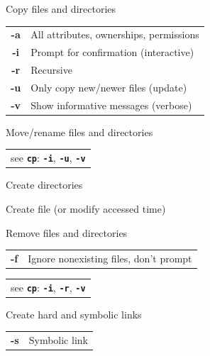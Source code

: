 \documentclass[12pt, a4paper]
{article}
\begin{document}
\begin{multicols}{3}
\begin{description}[nolistsep]
	\item[cp] Copy files and directories
	\item
	\begin{tabular}{cl}
		{\large \ttfamily \textbf{-a}} & All attributes, ownerships, permissions \\
		{\large \ttfamily \textbf{-i}} & Prompt for confirmation (interactive)\\
		{\large \ttfamily \textbf{-r}} & Recursive \\
		{\large \ttfamily \textbf{-u}} & Only copy new/newer files (update) \\
		{\large \ttfamily \textbf{-v}} & Show informative messages (verbose)\\
	\end{tabular}
	\item[mv] Move/rename files and directories
	\item
	\begin{tabular}{l}
		see \texttt{\textbf{cp}}: \texttt{\textbf{-i}}, \texttt{\textbf{-u}}, \texttt{\textbf{-v}}
	\end{tabular}
	\item[mkdir] Create directories
	\item[touch] Create file (or modify accessed time)
	\item[rm] Remove files and directories
	\item
	\begin{tabular}{cl}
		{\large \ttfamily \textbf{-f}} & Ignore nonexisting files, don't prompt
	\end{tabular}
	\item
	\begin{tabular}{l}
		see \texttt{\textbf{cp}}: \texttt{\textbf{-i}}, \texttt{\textbf{-r}}, \texttt{\textbf{-v}}
	\end{tabular}
	\item[ln] Create hard and symbolic links
	\item
	\begin{tabular}{cl}
		{\large \ttfamily \textbf{-s}} & Symbolic link
	\end{tabular}
\end{description}



\end{multicols}
\end{document}
